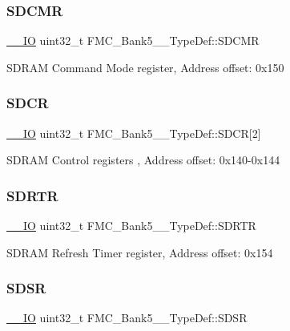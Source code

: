\subsubsection{\texorpdfstring{SDCMR}{SDCMR}}
{\footnotesize\ttfamily \mbox{\hyperlink{core__sc300_8h_aec43007d9998a0a0e01faede4133d6be}{\+\_\+\+\_\+\+IO}} uint32\+\_\+t F\+M\+C\+\_\+\+Bank5\+\_\+\_\+\+Type\+Def\+::\+S\+D\+C\+MR}

S\+D\+R\+AM Command Mode register, Address offset\+: 0x150 \mbox{\label{struct_f_m_c___bank5__6___type_def_a252c4ada37ac883b8e4fe0b08c781d0b}} 
\subsubsection{\texorpdfstring{SDCR}{SDCR}}
{\footnotesize\ttfamily \mbox{\hyperlink{core__sc300_8h_aec43007d9998a0a0e01faede4133d6be}{\+\_\+\+\_\+\+IO}} uint32\+\_\+t F\+M\+C\+\_\+\+Bank5\+\_\+\_\+\+Type\+Def\+::\+S\+D\+CR\mbox{[}2\mbox{]}}

S\+D\+R\+AM Control registers , Address offset\+: 0x140-\/0x144 \mbox{\label{struct_f_m_c___bank5__6___type_def_ac1887d031d16c1bf2c0a51ee9001f886}} 
\subsubsection{\texorpdfstring{SDRTR}{SDRTR}}
{\footnotesize\ttfamily \mbox{\hyperlink{core__sc300_8h_aec43007d9998a0a0e01faede4133d6be}{\+\_\+\+\_\+\+IO}} uint32\+\_\+t F\+M\+C\+\_\+\+Bank5\+\_\+\_\+\+Type\+Def\+::\+S\+D\+R\+TR}

S\+D\+R\+AM Refresh Timer register, Address offset\+: 0x154 \mbox{\label{struct_f_m_c___bank5__6___type_def_a9f268f86cf706c2c78d8a6a9fbe9d9a3}} 
\subsubsection{\texorpdfstring{SDSR}{SDSR}}
{\footnotesize\ttfamily \mbox{\hyperlink{core__sc300_8h_aec43007d9998a0a0e01faede4133d6be}{\+\_\+\+\_\+\+IO}} uint32\+\_\+t F\+M\+C\+\_\+\+Bank5\+\_\+\_\+\+Type\+Def\+::\+S\+D\+SR}

